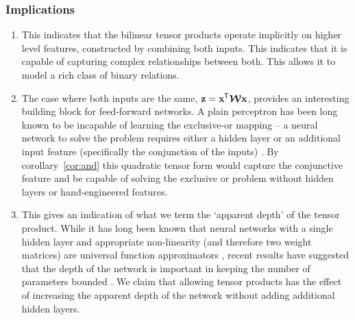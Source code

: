 \subsubsection{Implications}
\begin{enumerate}
\item
This indicates that the bilinear tensor products operate implicitly on higher
level features, constructed by combining both inputs. This indicates that it is capable of capturing
complex relationships between both. This allows it
to model a rich class of binary relations.

\item
The case where both inputs are the same, \(\mathbf{z} = \mathbf{x}^{\mkern-1.5mu\mathsf{T}}\bm{\mathcal{W}}\mathbf{x}\),
provides an interesting building block for feed-forward networks. A plain perceptron has been 
long known to be incapable of learning the exclusive-or
mapping \autocite{Minsky1969} -- a neural network to solve the problem requires either a hidden layer
or an additional input feature (specifically the conjunction of the inputs) \autocite{Rumelhart1986}.
By corollary~\ref{cor:and} this quadratic tensor form would capture the
conjunctive feature and be capable of solving the exclusive or problem without hidden
layers or hand-engineered features.

\item
This gives an indication of what we term the `apparent depth' of the
tensor product. While it has long been known that neural networks with a single hidden layer and
appropriate non-linearity (and therefore two weight matrices)
 are universal function approximators \autocite{Hornik1989}, recent results
have suggested that the depth of the network is important in keeping the number of parameters
bounded \autocite{Eldan2016, Telgarsky2016}. We claim that allowing tensor products has the effect
of increasing the apparent depth of the network without adding additional hidden layers.
\end{enumerate}

